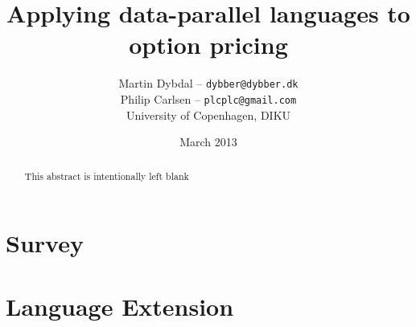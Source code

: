 \documentclass[10pt,a4paper,final,openright,twoside]{memoir}
\title{Applying data-parallel languages to option pricing}
\author{
  Martin Dybdal -- \texttt{dybber@dybber.dk} \\
  Philip Carlsen -- \texttt{plcplc@gmail.com}
\\
University of Copenhagen, DIKU}
\date{March 2013}
\begin{document}
\frontmatter






  \begin{abstract}
    This abstract is intentionally left blank
  \end{abstract}

\clearpage
\tableofcontents*

\mainmatter
{}




\part{Survey}
\label{part:survey}






\part{Language Extension}
\label{part:extensions}






\clearpage

{}
\printbibliography

\backmatter
\appendix

\end{document}
